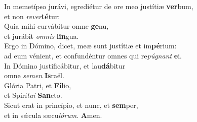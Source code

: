 \oddverse In memetípso jurávi, egrediétur de ore meo justítiæ \textbf{ver}bum,~\*\\
\oddverse et non \textit{re}\textit{ver}\textbf{té}tur:\\
\evenverse Quia mihi curvábitur omne \textbf{ge}nu,~\*\\
\evenverse et jurábit \textit{om}\textit{nis} \textbf{lin}gua.\\
\oddverse Ergo in Dómino, dicet, meæ sunt justítiæ et im\textbf{pé}rium:~\*\\
\oddverse ad eum vénient, et confundéntur omnes qui re\textit{pú}\textit{gnant} \textbf{e}i.\\
\evenverse In Dómino justificábitur, et lau\textbf{dá}bitur~\*\\
\evenverse omne \textit{se}\textit{men} \textbf{Is}raël.\\
\oddverse Glória Patri, et \textbf{Fí}lio,~\*\\
\oddverse et Spirí\textit{tu}\textit{i} \textbf{San}cto.\\
\evenverse Sicut erat in princípio, et nunc, et \textbf{sem}per,~\*\\
\evenverse et in sǽcula sæcu\textit{ló}\textit{rum}. \textbf{A}men.\\
